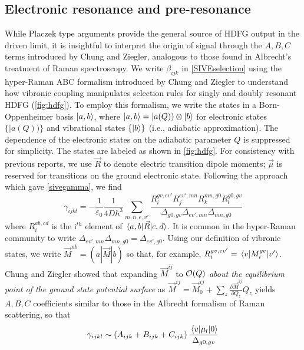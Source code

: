 \documentclass[aip, jcp, reprint, onecolumn]{revtex4-2}
\begin{document}
\subsection{Electronic resonance and pre-resonance}
While Placzek type arguments provide the general source of HDFG output in the driven limit, it is insightful to interpret the origin of signal through the $A,B,C$ terms introduced by Chung and Ziegler, analogous to those found in Albrecht's treatment of Raman spectroscopy.\cite{Albrecht1961, Ziegler1988} 
We write $\beta_{ijk}$ in \autoref{SIVEselection} using the hyper-Raman ABC formalism introduced by Chung and Ziegler to understand how vibronic coupling manipulates selection rules for singly and doubly resonant HDFG (\autoref{fig:hdfg}). \cite{Ziegler1988}
To employ this formalism, we write the states in a Born-Oppenheimer basis $\ket{a,b}$, where $\ket{a,b} = |a(Q)) \otimes \ket{b}$ for electronic states $\{|a(Q))\}$ and vibrational states $\{\ket{b}\}$ (i.e., adiabatic approximation). \cite{BornOppenheimer, Tang1970}
The dependence of the electronic states on the adiabatic parameter $Q$ is suppressed for simplicity.
The states are labeled as shown in \autoref{fig:hdfg}.
For consistency with previous reports, we use $\vec{R}$ to denote electric transition dipole moments; $\vec{\mu}$ is reserved for transitions on the ground electronic state. \cite{Tang1970}
Following the approach which gave \autoref{sivegamma}, we find
\begin{equation}\label{drgamma_notaylor}
	\gamma_{ijkl} = -\frac{1}{\varepsilon_0} \frac{1}{4D \hbar^3} \sum_{m,n,e,v'} \frac{
		R_{i}^{gv, ev'} 
		R_{j}^{ev',mn} 
		R_{k}^{mn,g0} 
		R_{l}^{g0,gv} 
	}{\Delta_{g0,gv}
		\Delta_{ev', mn}
		\Delta_{mn, g0}
	}
\end{equation}
where $R_{i}^{ab,cd}$ is the i$^{th}$ element of $\mel{a,b}{\vec{R}}{c,d}$.
It is common in the hyper-Raman community to write $\Delta_{ev', mn} \Delta_{mn, g0} = \Delta_{ev', g0}$.
Using our definition of vibronic states, we write $\vec{M}^{ab} = (a|\vec{M}|b)$ so that, for example,
$R_{i}^{gv,ev'} = \mel{v}{M_i^{ge}}{v'}$.
Chung and Ziegler showed that expanding $\vec{M}^{ij}$ to $\order{Q}$ \textit{about the equilibrium point of the ground state potential surface} as
$\vec{M}^{ij} = \vec{M}^{ij}_0 + \sum_z \frac{\partial\vec{M}^{ij}}{\partial Q_z} Q_z$
yields $A, B, C$ coefficients similar to those in the Albrecht formalism of Raman scattering, \cite{Albrecht1961, Ziegler1988} so that
\begin{equation}
		\gamma_{ijkl} \sim \left(A_{ijk} + B_{ijk} + C_{ijk}\right) \frac{\mel{v}{\mu_{l}}{0}} {\Delta_{g0,gv}}
\end{equation}
\end{document}
